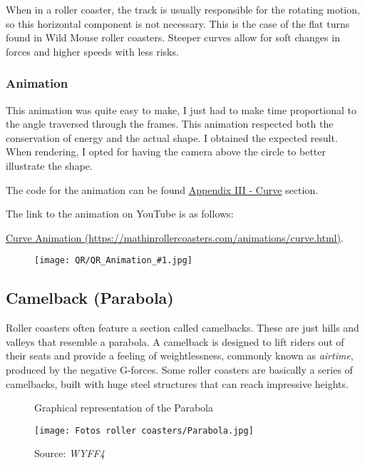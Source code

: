 \documentclass[12pt,twoside,a4paper]{article}
\newcommand{\source}[1]{\caption*{Source: \textit{#1}} }
\newcommand{\link}[1]{https://mathinrollercoasters.com/animations/#1.html}
\newcommand{\LinkToAnimation}[2]{
\noindent The code for the animation can be found \hyperref[sec:Appendix III_#1]{Appendix III - #1} section.

\noindent The link to the animation on YouTube is as follows:
	
\noindent \href{\link{#2}}{#1 Animation (\link{#2})}.
	
\begin{figure}[H]
	\centering
	\texttt{[image: QR/QR\_Animation\_\#1.jpg]}
\end{figure}
}
\begin{document}
	When in a roller coaster, the track is usually responsible for the rotating motion, so this horizontal component is not necessary. This is the case of the flat turns found in Wild Mouse roller coasters. Steeper curves allow for soft changes in forces and higher speeds with less risks.
	
	\newpage
	
	\subsubsection{Animation}
	This animation was quite easy to make, I just had to make time proportional to the angle traversed through the frames. This animation respected both the conservation of energy and the actual shape. I obtained the expected result. When rendering, I opted for having the camera above the circle to better illustrate the shape.
	
	\LinkToAnimation{Curve}{curve}
	
	\cleardoublepage
	
	\subsection{Camelback (Parabola)}
	Roller coasters often feature a section called camelbacks. These are just hills and valleys that resemble a parabola. A camelback is designed to lift riders out of their seats and provide a feeling of weightlessness, commonly known as \textit{airtime}, produced by the negative G-forces. Some roller coasters are basically a series of camelbacks, built with huge steel structures that can reach impressive heights.
	
	\begin{figure}[H]
		\centering
		\caption{Graphical representation of the Parabola}
		\label{graph:Parabola}
	\end{figure}

	\begin{figure}[H]
		\centering
		\texttt{[image: Fotos roller coasters/Parabola.jpg]}
		\caption{Parabola in a Roller Coaster}
		\label{fig:parabola}
		\source{WYFF4}
	\end{figure}
\end{document}

